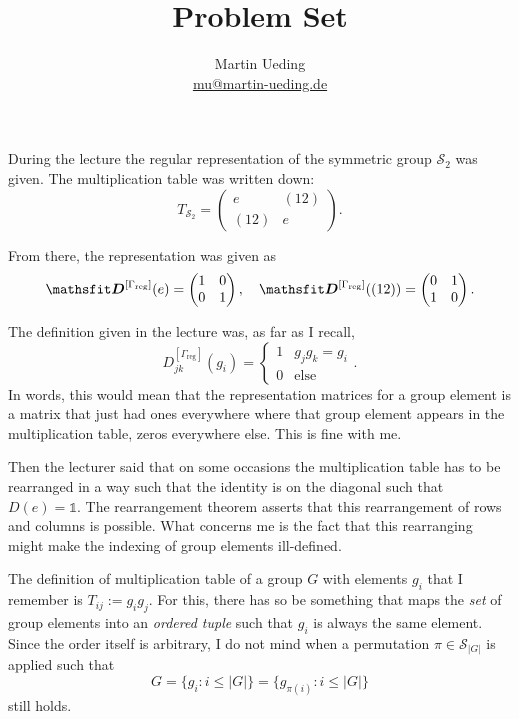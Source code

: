 \documentclass[11pt, english, fleqn, DIV=15, headinclude, BCOR=1cm]{scrartcl}
\title{Problem Set \arabic{problemset}}
\author{
    Martin Ueding \\ \small{\href{mailto:mu@martin-ueding.de}{mu@martin-ueding.de}}
}
\begin{document}
\maketitle

\begin{question}
    During the lecture the regular representation of the symmetric group
    $\mathcal S_2$ was given. The multiplication table was written down:
    \[
        T_{\mathcal S_2} =
        \begin{pmatrix}
            e & (12) \\
            (12) & e
        \end{pmatrix}.
    \]

    From there, the representation was given as
    \[
        \tens D^{[\Gamma_\text{reg}]}(e) =
        \begin{pmatrix}
            1 & 0 \\ 0 & 1
        \end{pmatrix}
        \eqnsep
        \tens D^{[\Gamma_\text{reg}]}((12)) =
        \begin{pmatrix}
            0 & 1 \\ 1 & 0
        \end{pmatrix}.
    \]

    The definition given in the lecture was, as far as I recall,
    \[
        D_{jk}^{[\Gamma_\text{reg}]} (g_i) =
        \begin{cases}
            1 & g_j g_k = g_i \\
            0 & \text{else}
        \end{cases}.
    \]
    In words, this would mean that the representation matrices for a group
    element is a matrix that just had ones everywhere where that group element
    appears in the multiplication table, zeros everywhere else. This is fine
    with me.

    Then the lecturer said that on some occasions the multiplication table has
    to be rearranged in a way such that the identity is on the diagonal such
    that $D(e) = \mathbb 1$. The rearrangement theorem asserts that this
    rearrangement of rows and columns is possible. What concerns me is the fact
    that this rearranging might make the indexing of group elements
    ill-defined.

    The definition of multiplication table of a group $G$ with elements $g_i$
    that I remember is $T_{ij} := g_i g_j$. For this, there has so be something
    that maps the \emph{set} of group elements into an \emph{ordered tuple}
    such that $g_i$ is always the same element. Since the order itself is
    arbitrary, I do not mind when a permutation $\pi \in \mathcal S_{|G|}$ is
    applied such that
    \[
        G = \{ g_i\colon i \leq |G| \} = \{ g_{\pi(i)} \colon i \leq |G| \}
    \]
    still holds.


\end{question}
\end{document}
